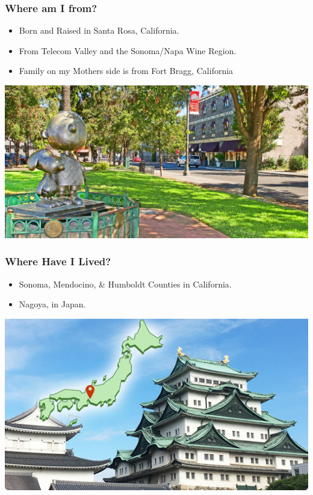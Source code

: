 \documentclass{beamer}
\begin{document}
		\begin{frame}
			\frametitle{Where am I from?}
				\begin{itemize}
					\item Born and Raised in Santa Rosa, California.  
					\item From Telecom Valley and the Sonoma/Napa Wine Region.
					\item Family on my Mothers side is from Fort Bragg, California
					\end{itemize}
				\begin{center}
					\includegraphics[width = 1.0\textwidth]{images/santa_rosa_1920x968.jpg}
				\end{center}
		\end{frame}
	
			\begin{frame}
		\frametitle{Where Have I Lived?}
		\begin{itemize}
			\item Sonoma, Mendocino, \& Humboldt Counties in California.  
			\item Nagoya, in Japan.  
		\end{itemize}
		\begin{center}
			\includegraphics[width = 1.0\textwidth]{images/nagoya.png}
		\end{center}
	\end{frame}
	
\end{document}
